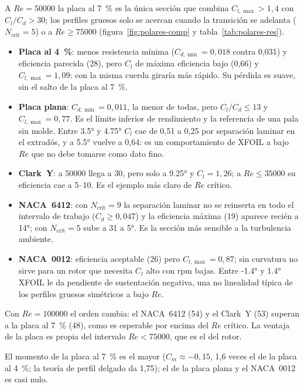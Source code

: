 A $Re=\num{50000}$ la placa al \SI{7}{\percent} es la única sección que combina
$C_{l,\max}>1{,}4$ con $C_l/C_d>30$; los perfiles gruesos solo se acercan cuando la
transición se adelanta ($N_{\text{crit}}=5$) o a $Re\ge\num{75000}$
(figura~\ref{fig:polares-comp} y tabla~\ref{tab:polares-res}).
\begin{itemize}
  \item \textbf{Placa al \SI{4}{\percent}}: menos resistencia mínima
        ($C_{d,\min}=0{,}018$ contra 0,031) y eficiencia parecida (28), pero $C_l$ de máxima
        eficiencia bajo (0,66) y $C_{l,\max}=1{,}09$: con la misma cuerda giraría más
        rápido.
        Su pérdida es suave, sin el salto de la placa al \SI{7}{\percent}.
  \item \textbf{Placa plana}: $C_{d,\min}=0{,}011$, la menor de todas, pero
        $C_l/C_d\le13$ y $C_{l,\max}=0{,}77$. Es el límite inferior de rendimiento y la
        referencia de una pala sin molde. Entre \ang{3.5} y \ang{4.75} $C_l$ cae de 0,51
        a 0,25 por separación laminar en el extradós, y a \ang{5.5} vuelve a 0,64: es un
        comportamiento de XFOIL a bajo $Re$ que no debe tomarse como dato fino.
  \item \textbf{Clark~Y}: a \num{50000} llega a 30, pero solo a \ang{9.25} y
        $C_l=1{,}26$; a $Re\le\num{35000}$ su eficiencia cae a 5--10. Es el ejemplo más
        claro de $Re$ crítico.
  \item \textbf{NACA~6412}: con $N_{\text{crit}}=9$ la separación laminar no se
        reinserta en todo el intervalo de trabajo ($C_d\ge0{,}047$) y la eficiencia
        máxima (19) aparece recién a \ang{14}; con $N_{\text{crit}}=5$ sube a 31 a
        \ang{5}. Es la sección más sensible a la turbulencia ambiente.
  \item \textbf{NACA~0012}: eficiencia aceptable (26) pero $C_{l,\max}=0{,}87$; sin
        curvatura no sirve para un rotor que necesita $C_l$ alto con rpm bajas. Entre
        \ang{-1.4} y \ang{1.4} XFOIL le da pendiente de sustentación negativa, una
        no linealidad típica de los perfiles gruesos simétricos a bajo $Re$.
\end{itemize}
Con $Re=\num{100000}$ el orden cambia: el NACA~6412 (54) y el Clark~Y (53) superan a la
placa al \SI{7}{\percent} (48), como es esperable por encima del $Re$ crítico. La ventaja
de la placa es propia del intervalo $Re<\num{75000}$, que es el del rotor.

El momento de la placa al \SI{7}{\percent} es el mayor ($C_m\approx-0{,}15$, 1,6 veces
el de la placa al \SI{4}{\percent}; la teoría de perfil delgado da 1,75); el de la placa
plana y el NACA~0012 es casi nulo.

